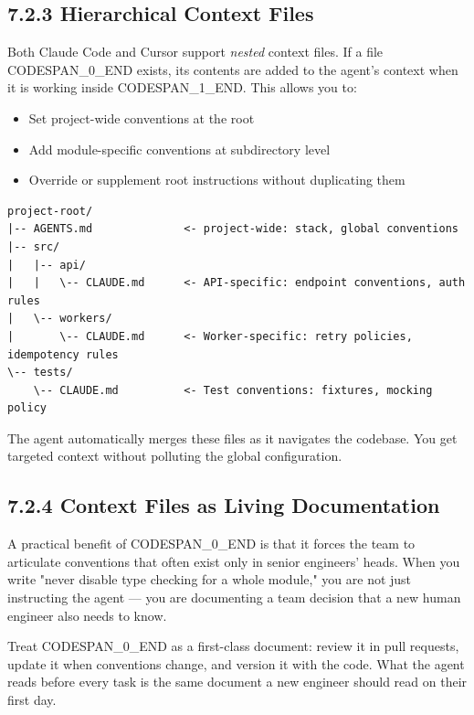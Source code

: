 \documentclass[11pt,a4paper]{book}
\begin{document}
\subsection{7.2.3 Hierarchical Context Files}

Both Claude Code and Cursor support \textit{nested} context files. If a file CODESPAN\_0\_END exists, its contents are added to the agent's context when it is working inside CODESPAN\_1\_END. This allows you to:

\begin{itemize}
  \item Set project-wide conventions at the root
  \item Add module-specific conventions at subdirectory level
  \item Override or supplement root instructions without duplicating them
\end{itemize}

\begin{lstlisting}
project-root/
|-- AGENTS.md              <- project-wide: stack, global conventions
|-- src/
|   |-- api/
|   |   \-- CLAUDE.md      <- API-specific: endpoint conventions, auth rules
|   \-- workers/
|       \-- CLAUDE.md      <- Worker-specific: retry policies, idempotency rules
\-- tests/
    \-- CLAUDE.md          <- Test conventions: fixtures, mocking policy
\end{lstlisting}

The agent automatically merges these files as it navigates the codebase. You get targeted context without polluting the global configuration.

\subsection{7.2.4 Context Files as Living Documentation}

A practical benefit of CODESPAN\_0\_END is that it forces the team to articulate conventions that often exist only in senior engineers' heads. When you write "never disable type checking for a whole module," you are not just instructing the agent --- you are documenting a team decision that a new human engineer also needs to know.

Treat CODESPAN\_0\_END as a first-class document: review it in pull requests, update it when conventions change, and version it with the code. What the agent reads before every task is the same document a new engineer should read on their first day.

\medskip
\end{document}
